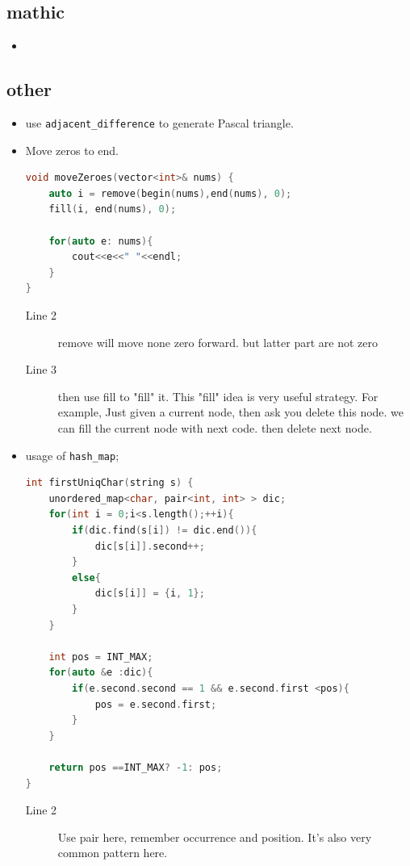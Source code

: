 \documentclass[a4paper,11pt,twoside]{book}
\begin{document}
\subsection{mathic}
\begin{itemize}
	\item 
\end{itemize}

\subsection{other}
\begin{itemize}

\item use \texttt{adjacent\_difference} to generate Pascal triangle. 	
	
\item Move zeros to end.
\begin{lstlisting}[frame=single, language=c++]	
void moveZeroes(vector<int>& nums) {
	auto i = remove(begin(nums),end(nums), 0);
	fill(i, end(nums), 0);
	
	for(auto e: nums){
		cout<<e<<" "<<endl;
	}
}	
\end{lstlisting}
\begin{description}
	\item[Line 2] remove will move none zero forward. but latter part are not zero
	\item[Line 3] then use fill to "fill" it. This "fill" idea is very useful strategy. For example, Just given a current node, then ask you delete this node. we can fill the current node with next code. then delete next node. 
	
\end{description}

\item usage of \texttt{hash\_map}; 
\begin{lstlisting}[frame=single, language=c++]	
int firstUniqChar(string s) {
	unordered_map<char, pair<int, int> > dic;
	for(int i = 0;i<s.length();++i){
		if(dic.find(s[i]) != dic.end()){
			dic[s[i]].second++;
		}
		else{
			dic[s[i]] = {i, 1};
		}
	}
	
	int pos = INT_MAX;
	for(auto &e :dic){
		if(e.second.second == 1 && e.second.first <pos){
			pos = e.second.first;
		}
	}
	
	return pos ==INT_MAX? -1: pos;
}
\end{lstlisting}
\begin{description}
	\item[Line 2] Use pair here, remember occurrence and position. It's also very common pattern here.	
\end{description}	



\end{itemize}
\end{document}
